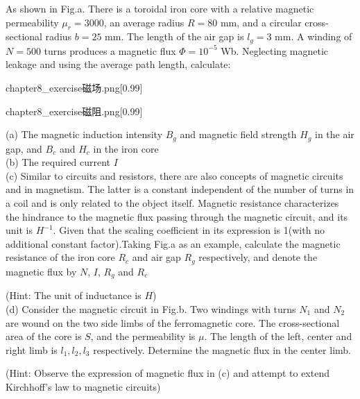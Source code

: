 \begin{example}
    As shown in Fig.a. There is a toroidal iron core with a relative magnetic permeability $\mu_r = 3000$, an average radius \( R = 80 \) mm, and a circular cross-sectional 
    radius \( b = 25 \) mm. The length of the air gap is \( l_g = 3 \) mm. A winding of $N=500$ turns produces a magnetic flux \(\Phi =  10^{-5} \) Wb. 
    Neglecting magnetic leakage and using the average path length, calculate:
    \begin{minipage}{0.45\textwidth}
        \centering
        \begin{singlefigure}[a]{chapter8_exercise磁场.png}[0.99]
        \end{singlefigure}
    \end{minipage}
    \begin{minipage}{0.45\textwidth}
        \centering
        \begin{singlefigure}[b]{chapter8_exercise磁阻.png}[0.99]
        \end{singlefigure}
    \end{minipage}
    
    (a) The magnetic induction intensity \( B_g \) and magnetic field strength \( H_g \) in the air gap, and \( B_c \) and \( H_c \) in the iron core\\
    (b) The required current \( I \)\\
    (c) Similar to circuits and resistors, there are also concepts of magnetic circuits and  in magnetism. The latter is a constant 
    independent of the number of turns in a coil and is only related to the object itself. Magnetic resistance characterizes the hindrance to the magnetic flux passing through the magnetic 
    circuit, and its unit is $H^{-1}$. Given that the scaling coefficient in its expression is 1(with no additional constant factor).Taking Fig.a as an example, calculate the magnetic 
    resistance of the iron core \( R_c \) and air gap \( R_g \) respectively, and denote the magnetic flux by $N$, $I$, $R_g$ and $R_c$
    
    (Hint: The unit of inductance is $H$)\\
    (d) Consider the magnetic circuit in Fig.b. Two windings with turns $N_1$ and $N_2$ are wound on the two side limbs of the ferromagnetic core. The cross-sectional area of the 
    core is $S$, and the permeability is $\mu$. The length of the left, center and right limb is \(l_1, l_2, l_3\) respectively. Determine the magnetic flux in the center limb.
    
    (Hint: Observe the expression of magnetic flux in (c) and attempt to extend Kirchhoff's law to magnetic circuits)
\end{example}

